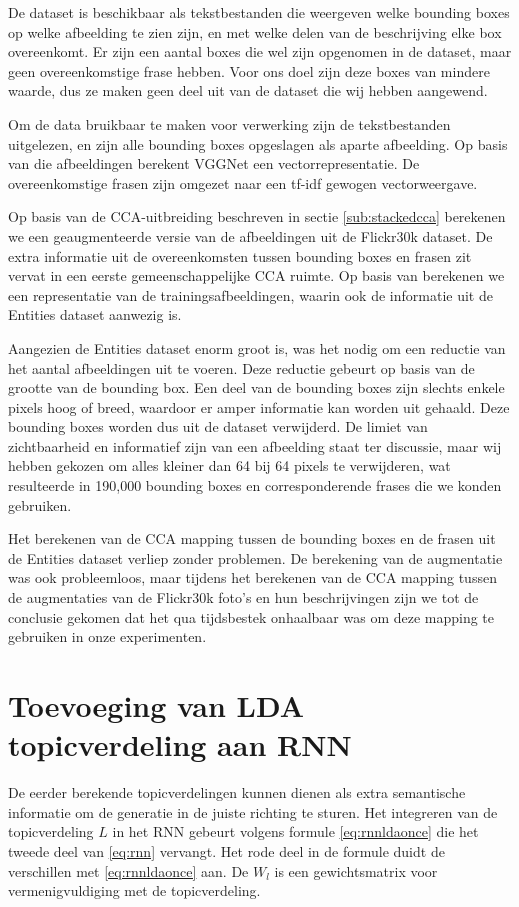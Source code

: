 De dataset is beschikbaar als tekstbestanden die weergeven welke bounding boxes op welke afbeelding te zien zijn, en met welke delen van de beschrijving elke box overeenkomt. Er zijn een aantal boxes die wel zijn opgenomen in de dataset, maar geen overeenkomstige frase hebben. Voor ons doel zijn deze boxes van mindere waarde, dus ze maken geen deel uit van de dataset die wij hebben aangewend. 

Om de data bruikbaar te maken voor verwerking zijn de tekstbestanden uitgelezen, en zijn alle bounding boxes opgeslagen als aparte afbeelding. Op basis van die afbeeldingen berekent VGGNet een vectorrepresentatie. De overeenkomstige frasen zijn omgezet naar een tf-idf gewogen vectorweergave. 

Op basis van de CCA-uitbreiding beschreven in sectie \ref{sub:stackedcca} berekenen we een geaugmenteerde versie van de afbeeldingen uit de Flickr30k dataset. De extra informatie uit de overeenkomsten tussen bounding boxes en frasen zit vervat in een eerste gemeenschappelijke CCA ruimte. Op basis van  berekenen we een representatie van de trainingsafbeeldingen, waarin ook de informatie uit de Entities dataset aanwezig is.

Aangezien de Entities dataset enorm groot is, was het nodig om een reductie van het aantal afbeeldingen uit te voeren. Deze reductie gebeurt op basis van de grootte van de bounding box. Een deel van de bounding boxes zijn slechts enkele pixels hoog of breed, waardoor er amper informatie kan worden uit gehaald. Deze bounding boxes worden dus uit de dataset verwijderd. De limiet van zichtbaarheid en informatief zijn van een afbeelding staat ter discussie, maar wij hebben gekozen om alles kleiner dan 64 bij 64 pixels te verwijderen, wat resulteerde in 190,000 bounding boxes en corresponderende frases die we konden gebruiken. 

Het berekenen van de CCA mapping tussen de bounding boxes en de frasen uit de Entities dataset verliep zonder problemen. De berekening van de augmentatie was ook probleemloos, maar tijdens het berekenen van de CCA mapping tussen de augmentaties van de Flickr30k foto's en hun beschrijvingen zijn we tot de conclusie gekomen dat het qua tijdsbestek onhaalbaar was om deze mapping te gebruiken in onze experimenten. 


\section{Toevoeging van LDA topicverdeling aan RNN}
De eerder berekende topicverdelingen kunnen dienen als extra semantische informatie om de generatie in de juiste richting te sturen. Het integreren van de topicverdeling $L$ in het RNN gebeurt volgens formule \eqref{eq:rnnldaonce} die het tweede deel van \eqref{eq:rnn} vervangt. Het rode deel in de formule duidt de verschillen met \eqref{eq:rnnldaonce} aan. De $W_l$ is een gewichtsmatrix voor vermenigvuldiging met de topicverdeling.

